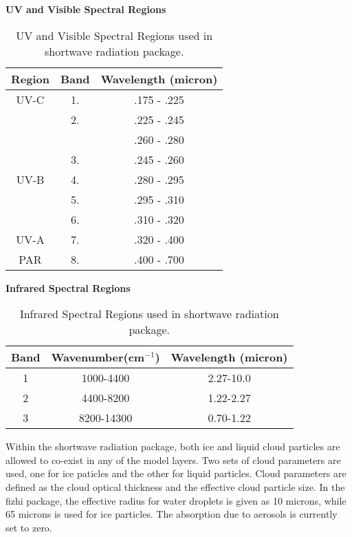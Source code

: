 \begin{table}[htb]
\begin{center}
{\bf UV and Visible Spectral Regions} \\
\vspace{0.1in}
\begin{tabular}{|c|c|c|} 
\hline
Region & Band & Wavelength (micron) \\ \hline
\hline
UV-C   &  1.  &  .175 - .225  \\
       &  2.  &  .225 - .245  \\
       &      &  .260 - .280  \\
       &  3.  &  .245 - .260  \\ \hline
UV-B   &  4.  &  .280 - .295  \\
       &  5.  &  .295 - .310  \\
       &  6.  &  .310 - .320  \\ \hline
UV-A   &  7.  &  .320 - .400  \\ \hline
PAR    &  8.  &  .400 - .700  \\
\hline
\end{tabular}
\end{center}
\caption{UV and Visible Spectral Regions used in shortwave radiation package.}
\label{tab:fizhi:solar2}
\end{table}

\begin{table}[htb]
\begin{center}
{\bf Infrared Spectral Regions} \\
\vspace{0.1in}
\begin{tabular}{|c|c|c|} 
\hline
Band & Wavenumber(cm$^{-1}$) & Wavelength (micron) \\ \hline
\hline
1  &    1000-4400    &    2.27-10.0 \\
2  &    4400-8200    &    1.22-2.27 \\
3  &    8200-14300   &    0.70-1.22 \\
\hline
\end{tabular}
\end{center}
\caption{Infrared Spectral Regions used in shortwave radiation package.}
\label{tab:fizhi:solar1}
\end{table}

Within the shortwave radiation package, 
both ice and liquid cloud particles are allowed to co-exist in any of the model layers. 
Two sets of cloud parameters are used, one for ice paticles and the other for liquid particles.
Cloud parameters are defined as the cloud optical thickness and the effective cloud particle size.
In the fizhi package, the effective radius for water droplets is given as 10 microns,
while 65 microns is used for ice particles.  The absorption due to aerosols is currently
set to zero.

